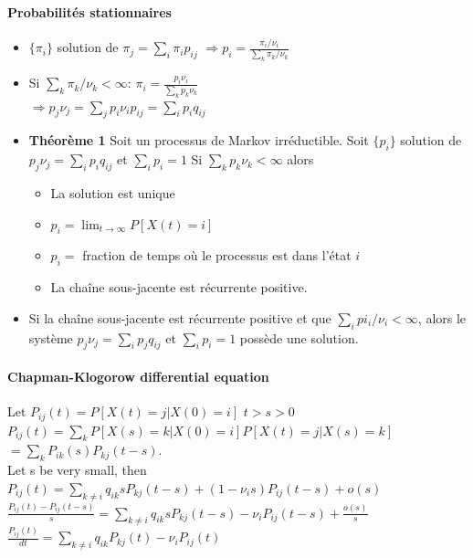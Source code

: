 \documentclass[paper=a4,fontsize=8pt,pagesize,DIV=calc]{scrartcl}
\newcounter{row}
\begin{document}
\begin{multicols}{3}
 \paragraph{Probabilités stationnaires}
 \begin{itemize}
 \item $\{ \pi_{i}\}$ solution de $\pi_j=\sum_i \pi_i p_{ij}$ $ \Rightarrow p_i=\frac{\pi_i/\nu_i}{\sum_k \pi_k/\nu_k}$
 \item Si $\sum_k \pi_k/\nu_k<\infty $: $\pi_i=\frac{p_i \nu_i}{\sum_k p_k \nu_k}$
 \\ $\Rightarrow p_j\nu_j =\sum_j p_i \nu_i p_{ij}=\sum_i p_iq_{ij}$
 \item \textbf{Théorème 1} Soit un processus de Markov irréductible. Soit $\{p_i\}$ solution de $p_j\nu_j = \sum_i p_iq_{ij}$ et $\sum_i p_i =1$ Si $\sum_k p_k\nu_k <\infty$ alors
\begin{itemize}
\item La solution est unique
\item $p_i = \lim_{t\to\infty}P[X(t) = i]$
\item $p_i =$ fraction de temps où le processus est dans l'état $i$
\item La chaîne sous-jacente est récurrente positive.
\end{itemize}
\item Si la chaîne sous-jacente est récurrente positive et que  $\sum_i pi_i/\nu_i<\infty$, alors le système $p_j\nu_j =\sum_i p_j q_{ij}$ et $\sum_i p_i = 1$ possède une solution.
 \end{itemize}
 \paragraph{Chapman-Klogorow differential equation}
Let $P_{ij}(t) = P[X(t) = j|X(0) = i]$ \qquad $t > s > 0$
\\$P_{ij}(t) =\sum_k P[X(s) = k|X(0) = i]P[X(t) = j|X(s) = k]$ 
\\$=\sum_k P_{ik}(s)P_{kj}(t - s).$
\\ Let s be very small, then
\\$P_{ij}(t) =\sum_{k\neq i} q_{ik}sP_{kj}(t - s) + (1 - \nu_i s)P_{ij}(t - s) + o(s)$
\\$\frac{P_{ij}(t) - P_{ij}(t - s)}{s}=\sum_{k\neq i} q_{ik}sP_{kj}(t - s) -\nu_i P_{ij}(t - s) + \frac{o(s)}{s}$
\\$\frac{P_{ij}(t)}{dt}=\sum_{k\neq i} q_{ik}P_{kj}(t) -\nu_i P_{ij}(t) $

\end{multicols}
\end{document}
